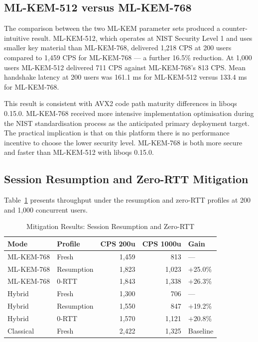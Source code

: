 \documentclass[conference]{IEEEtran}
\begin{document}
\subsection{ML-KEM-512 versus ML-KEM-768}

The comparison between the two ML-KEM parameter sets produced a counter-intuitive
result. ML-KEM-512, which operates at NIST Security Level 1 and uses smaller key
material than ML-KEM-768, delivered 1,218 CPS at 200 users compared to 1,459 CPS for
ML-KEM-768 --- a further 16.5\% reduction. At 1,000 users ML-KEM-512 delivered 711 CPS
against ML-KEM-768's 813 CPS. Mean handshake latency at 200 users was 161.1 ms for
ML-KEM-512 versus 133.4 ms for ML-KEM-768.

This result is consistent with AVX2 code path maturity differences in liboqs 0.15.0.
ML-KEM-768 received more intensive implementation optimisation during the NIST
standardisation process as the anticipated primary deployment target. The practical
implication is that on this platform there is no performance incentive to choose the
lower security level. ML-KEM-768 is both more secure and faster than ML-KEM-512 with
liboqs 0.15.0.

\subsection{Session Resumption and Zero-RTT Mitigation}

Table~\ref{tab:mitigation} presents throughput under the resumption and zero-RTT
profiles at 200 and 1,000 concurrent users.

\begin{table}[htbp]
\caption{Mitigation Results: Session Resumption and Zero-RTT}
\label{tab:mitigation}
\begin{center}
\begin{tabular}{llrrl}
\toprule
\textbf{Mode} & \textbf{Profile} & \textbf{CPS 200u} & \textbf{CPS 1000u} & \textbf{Gain} \\
\midrule
ML-KEM-768  & Fresh       & 1,459 &   813 & --- \\
ML-KEM-768  & Resumption  & 1,823 & 1,023 & $+$25.0\% \\
ML-KEM-768  & 0-RTT       & 1,843 & 1,338 & $+$26.3\% \\
Hybrid      & Fresh       & 1,300 &   706 & --- \\
Hybrid      & Resumption  & 1,550 &   847 & $+$19.2\% \\
Hybrid      & 0-RTT       & 1,570 & 1,121 & $+$20.8\% \\
Classical   & Fresh       & 2,422 & 1,325 & Baseline \\
\bottomrule
\end{tabular}
\end{center}
\end{table}
\end{document}
